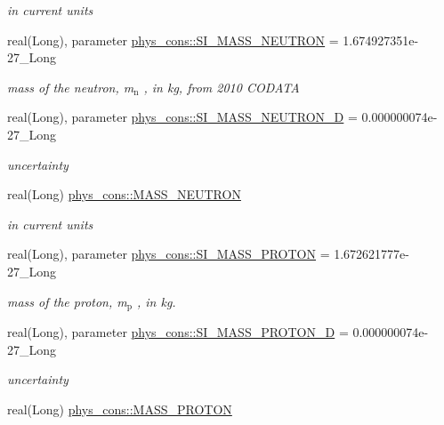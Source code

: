 \begin{DoxyCompactItemize}
\begin{DoxyCompactList}\small\item\em in current units \item\end{DoxyCompactList}\item 
real(Long), parameter \hyperlink{namespacephys__cons_ab117ad83bb79e4ed199d17f3c63ec4b3}{phys\_\-cons::SI\_\-MASS\_\-NEUTRON} = 1.674927351e-\/27\_\-Long
\begin{DoxyCompactList}\small\item\em mass of the neutron, m$_{\mbox{n}}$ , in kg, from 2010 CODATA \item\end{DoxyCompactList}\item 
real(Long), parameter \hyperlink{namespacephys__cons_af635c94d544c5bc6dcb05186a9f81d84}{phys\_\-cons::SI\_\-MASS\_\-NEUTRON\_\-D} = 0.000000074e-\/27\_\-Long
\begin{DoxyCompactList}\small\item\em uncertainty \item\end{DoxyCompactList}\item 
real(Long) \hyperlink{namespacephys__cons_abeff422917cc48601644e90ab12fb7c0}{phys\_\-cons::MASS\_\-NEUTRON}
\begin{DoxyCompactList}\small\item\em in current units \item\end{DoxyCompactList}\item 
real(Long), parameter \hyperlink{namespacephys__cons_a6a740864089f117512dc89ea53f3dc5f}{phys\_\-cons::SI\_\-MASS\_\-PROTON} = 1.672621777e-\/27\_\-Long
\begin{DoxyCompactList}\small\item\em mass of the proton, m$_{\mbox{p}}$ , in kg. \item\end{DoxyCompactList}\item 
real(Long), parameter \hyperlink{namespacephys__cons_a3c37a18a918519962cfc26597082d53d}{phys\_\-cons::SI\_\-MASS\_\-PROTON\_\-D} = 0.000000074e-\/27\_\-Long
\begin{DoxyCompactList}\small\item\em uncertainty \item\end{DoxyCompactList}\item 
real(Long) \hyperlink{namespacephys__cons_a20e8ed3d7ff389588ce024048c5ccf85}{phys\_\-cons::MASS\_\-PROTON}

\end{DoxyCompactItemize}

